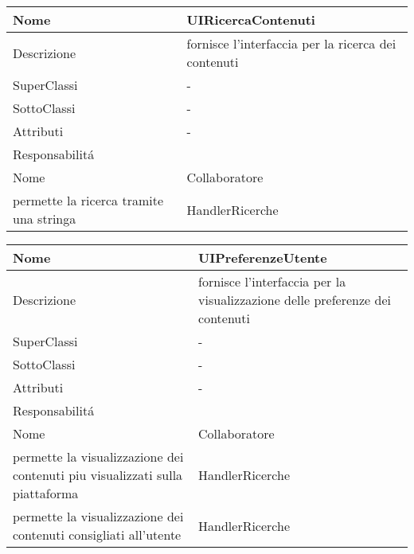 \begin{center} %
    \begin{longtable}{ |p{3cm}|p{3cm}|p{3cm}|p{3cm}| }
        \hline
        Nome & \multicolumn{3}{|p{9cm}|}{UIRicercaContenuti} \\\hline
        Descrizione & \multicolumn{3}{|p{9cm}|}{fornisce l'interfaccia per la ricerca dei contenuti} \\\hline
        SuperClassi & \multicolumn{3}{|p{9cm}|}{-} \\\hline
        SottoClassi & \multicolumn{3}{|p{9cm}|}{-} \\\hline
        Attributi & \multicolumn{3}{|p{9cm}|}{-} \\\hline
        \multicolumn{4}{|p{12cm}|}{Responsabilit\'a} \\\hline %
        \multicolumn{2}{|p{6cm}|}{Nome} & \multicolumn{2}{|p{6cm}|}{Collaboratore} \\\hline %
        \multicolumn{2}{|p{6cm}|}{permette la ricerca tramite una stringa} & \multicolumn{2}{|p{6cm}|}{HandlerRicerche} \\\hline        
    \end{longtable}
\end{center}

\begin{center} %
    \begin{longtable}{ |p{3cm}|p{3cm}|p{3cm}|p{3cm}| }
        \hline
        Nome & \multicolumn{3}{|p{9cm}|}{UIPreferenzeUtente} \\\hline
        Descrizione & \multicolumn{3}{|p{9cm}|}{fornisce l'interfaccia per la visualizzazione delle preferenze dei contenuti} \\\hline
        SuperClassi & \multicolumn{3}{|p{9cm}|}{-} \\\hline
        SottoClassi & \multicolumn{3}{|p{9cm}|}{-} \\\hline
        Attributi & \multicolumn{3}{|p{9cm}|}{-} \\\hline
        \multicolumn{4}{|p{12cm}|}{Responsabilit\'a} \\\hline %
        \multicolumn{2}{|p{6cm}|}{Nome} & \multicolumn{2}{|p{6cm}|}{Collaboratore} \\\hline %
        \multicolumn{2}{|p{6cm}|}{permette la visualizzazione dei contenuti piu visualizzati sulla piattaforma} & \multicolumn{2}{|p{6cm}|}{HandlerRicerche} \\\hline        
        \multicolumn{2}{|p{6cm}|}{permette la visualizzazione dei contenuti consigliati all'utente} & \multicolumn{2}{|p{6cm}|}{HandlerRicerche} \\\hline        
    \end{longtable}
\end{center}

